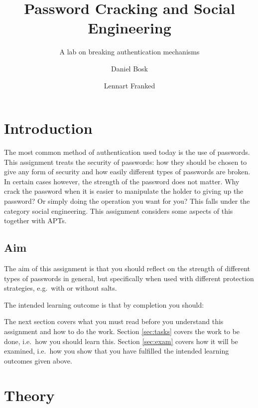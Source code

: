 \title{%
  Password Cracking and Social Engineering
}
\subtitle{%
  A lab on breaking authentication mechanisms
}
\author{%
  Daniel Bosk \and Lennart Franked
}

\maketitle


\section{Introduction}
\label{sec:Introduktion}
The most common method of authentication used today is the use of passwords.
This assignment treats the security of passwords: how they should be chosen to 
give any form of security and how easily different types of passwords are 
broken.
In certain cases however, the strength of the password does not matter.
Why crack the password when it is easier to manipulate the holder to giving up 
the password?
Or simply doing the operation you want for you?
This falls under the category social engineering.
This assignment considers some aspects of this together with \acp{APT}.

\subsection{Aim}
\label{sec:Syfte}
The aim of this assignment is that you should reflect on the strength of 
different types of passwords in general, but specifically when used with 
different protection strategies, e.g.~with or without salts.

The intended learning outcome is that by completion you should:
\begin{itemize}
	
\end{itemize}

The next section covers what you must read before you understand this 
assignment and how to do the work.
Section \ref{sec:tasks} covers the work to be done, i.e.~how you should learn 
this.
Section \ref{sec:exam} covers how it will be examined, i.e.~how you show that 
you have fulfilled the intended learning outcomes given above.


\section{Theory}
\label{sec:theory}



